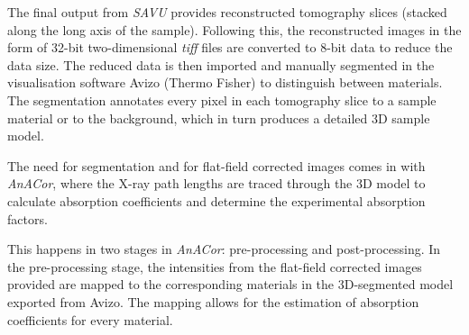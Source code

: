 The final output from \textit{SAVU} provides reconstructed tomography slices (stacked along the long axis of the sample). Following this, the reconstructed images in the form of 32-bit two-dimensional \textit{tiff} files are converted to 8-bit data to reduce the data size. The reduced data is then imported and manually segmented in the visualisation software Avizo (Thermo Fisher) to distinguish between materials. The segmentation annotates every pixel in each tomography slice to a sample material or to the background, which in turn produces a detailed 3D sample model.


The need for segmentation and for flat-field corrected images comes in with \textit{AnACor}, where the X-ray path lengths are traced through the 3D model to calculate absorption coefficients and determine the experimental absorption factors.

This happens in two stages in \textit{AnACor}: pre-processing and post-processing. In the pre-processing stage, the intensities from the flat-field corrected images provided are mapped to the corresponding materials in the 3D-segmented model exported from Avizo. The mapping allows for the estimation of absorption coefficients for every material.%

